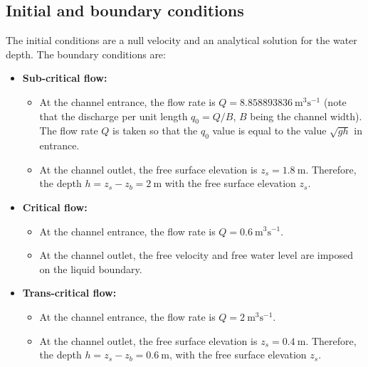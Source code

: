 \subsection{Initial and boundary conditions}
The initial conditions are a null velocity and an analytical solution for the water depth.
The boundary conditions are:
\begin{itemize}
\item {\bf Sub-critical flow:} 
\begin{itemize}
\item At the channel entrance, the flow rate is $Q =  8.858893836~\text{m}^3\text{s}^{-1}$
(note that the discharge per unit length $q_0=Q/B$,
$B$ being the channel width).
The flow rate $Q$ is taken so that the $q_0$ value is equal to the value
$\sqrt{gh}$ in entrance. 
\item At the channel outlet, the free surface elevation is $ z_{s} = 1.8~\text{m}$.
Therefore, the depth
$\displaystyle{h = z_{s}-z_b = 2~\text{m}}$ with the free surface elevation $z_{s}$.
\end{itemize}

\item {\bf Critical flow:}
\begin{itemize}
\item At the channel entrance, the flow rate is $Q = 0.6~\text{m}^3\text{s}^{-1}$. 
\item At the channel outlet, the free velocity and free water level are
imposed on the liquid boundary.
\end{itemize}

\item {\bf Trans-critical flow:}
\begin{itemize}
\item  At the channel entrance, the flow rate is $Q = 2~\text{m}^3\text{s}^{-1}$.
\item  At the channel outlet, the free surface elevation is
$z_{s} = 0.4~\text{m}$. Therefore, the depth
$\displaystyle{h = z_{s}-z_b = 0.6~\text{m}}$, with the free surface elevation $z_{s}$.
\end{itemize}

\end{itemize}


